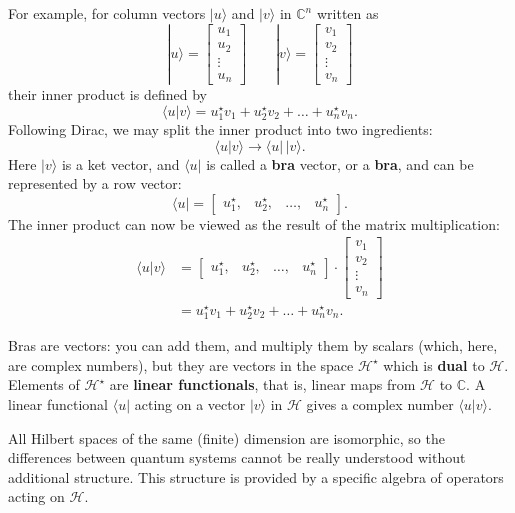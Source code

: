 \documentclass[fleqn,a4paper]{article}
\newenvironment{idea}{\everypar{\setlength{\parindent}{1.5em}}}{}
\theoremstyle{definition}
\theoremstyle{definition}
\theoremstyle{definition}
\theoremstyle{definition}
\theoremstyle{remark}
\begin{document}
For example, for column vectors \(|u\rangle\) and \(|v\rangle\) in \(\mathbb{C}^n\) written as
\[
  |u\rangle
  = \begin{bmatrix}u_1\\u_2\\\vdots\\u_n\end{bmatrix}
  \qquad
  |v\rangle
  = \begin{bmatrix}v_1\\v_2\\\vdots\\v_n\end{bmatrix}
\]
their inner product is defined by
\[
  \langle u|v\rangle
  = u_1^\star v_1 + u_2^\star v_2+\ldots + u_n^\star v_n.
\]
Following Dirac, we may split the inner product into two ingredients:
\[
  \langle u|v\rangle
  \longrightarrow \langle u|\,|v\rangle.
\]
Here \(|v\rangle\) is a ket vector, and \(\langle u|\) is called a \textbf{bra} vector, or a \textbf{bra}, and can be represented by a row vector:
\[
  \langle u|
  = \begin{bmatrix}u_1^\star,&u_2^\star,&\ldots,&u_n^\star\end{bmatrix}.
\]
The inner product can now be viewed as the result of the matrix multiplication:
\[
  \begin{aligned}
    \langle u|v\rangle
    &= \begin{bmatrix}u_1^\star,&u_2^\star,&\ldots,&u_n^\star\end{bmatrix}
    \cdot \begin{bmatrix}v_1\\v_2\\\vdots\\v_n\end{bmatrix}
  \\&= u_1^\star v_1 + u_2^\star v_2 + \ldots + u_n^\star v_n.
  \end{aligned}
\]

Bras are vectors: you can add them, and multiply them by scalars (which, here, are complex numbers), but they are vectors in the space \({\mathcal{H}}^\star\) which is \textbf{dual} to \(\mathcal{H}\).
Elements of \({\mathcal{H}}^\star\) are \textbf{linear functionals}, that is, linear maps from \(\mathcal{H}\) to \(\mathbb{C}\).
A linear functional \(\langle u|\) acting on a vector \(|v\rangle\) in \(\mathcal{H}\) gives a complex number \(\langle u|v\rangle\).

\begin{idea}
All Hilbert spaces of the same (finite) dimension are isomorphic, so the differences between quantum systems cannot be really understood without additional structure. This structure is provided by a specific algebra of operators acting on \(\mathcal{H}\).

\end{idea}
\end{document}

